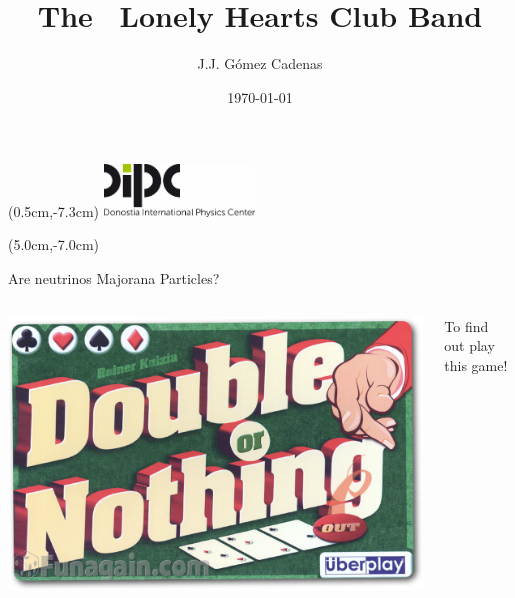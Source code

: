 \documentclass [aspectratio=169]{beamer}
\title[]{\vspace{60pt} \\
The \bbonu\ Lonely Hearts Club Band} %
\author[]{J.J. Gómez Cadenas}
\institute[]{Donostia International Physics Center}
\date{\today}
\begin{document}
{
\begin{frame}
    \titlepage
    \begin{textblock*}{4cm}(0.5cm,-7.3cm)
        \includegraphics[width=4cm]{dipc.png}
    \end{textblock*}
    \begin{textblock*}{8cm}(5.0cm,-7.0cm)
        \huge {} %
    \end{textblock*}
\end{frame}
}

%
%
%
%

\begin{frame}{Are neutrinos Majorana Particles?}

\begin{columns}
\includegraphics[scale=0.35]{DoubleOrNothing.png}

To find out play this game!   
\end{columns}
\end{frame}
\end{document}
